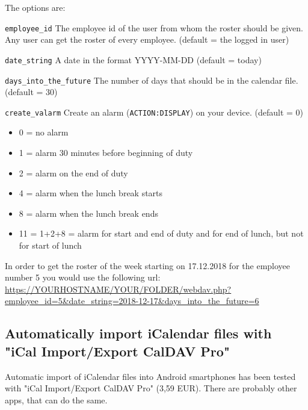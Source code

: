 The options are:
\begin{description}
	\item \lstinline|employee_id|
	The employee id of the user from whom the roster should be given.
	Any user can get the roster of every employee.
	(default = the logged in user)
	\item \lstinline|date_string|
	A date in the format YYYY-MM-DD
	(default = today)
	\item \lstinline|days_into_the_future|
	The number of days that should be in the calendar file.
	(default = 30)
	\item \lstinline|create_valarm|
	Create an alarm (\lstinline|ACTION:DISPLAY|) on your device.
	(default = 0)
	\begin{itemize}
        \item 0 = no alarm
        \item 1 = alarm 30 minutes before beginning of duty
        \item 2 = alarm on the end of duty
        \item 4 = alarm when the lunch break starts
        \item 8 = alarm when the lunch break ends
        \item 11 = 1+2+8 = alarm for start and end of duty and for end of lunch, but not for start of lunch
    \end{itemize}	
\end{description}	

In order to get the roster of the week starting on 17.12.2018 for the employee number 5 you would use the following url:
\url{https://YOURHOSTNAME/YOUR/FOLDER/webdav.php?employee_id=5&date_string=2018-12-17&days_into_the_future=6}

\subsection{Automatically import iCalendar files with "iCal Import/Export CalDAV Pro"}
Automatic import of iCalendar files into Android smartphones has been tested with 
"iCal Import/Export CalDAV Pro" (3,59 EUR). There are probably other apps, that can do the same.

